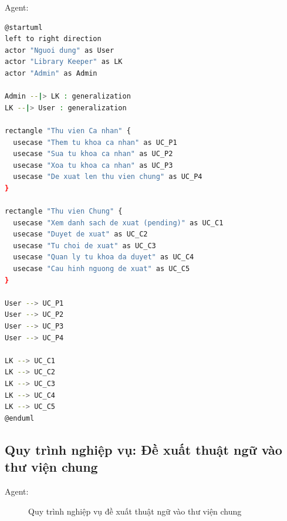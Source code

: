 Agent:
\begin{lstlisting}[language=bash, caption={PlantUML source -- Use Case phan ra: Quan ly thuat ngu}]
@startuml
left to right direction
actor "Nguoi dung" as User
actor "Library Keeper" as LK
actor "Admin" as Admin

Admin --|> LK : generalization
LK --|> User : generalization

rectangle "Thu vien Ca nhan" {
  usecase "Them tu khoa ca nhan" as UC_P1
  usecase "Sua tu khoa ca nhan" as UC_P2
  usecase "Xoa tu khoa ca nhan" as UC_P3
  usecase "De xuat len thu vien chung" as UC_P4
}

rectangle "Thu vien Chung" {
  usecase "Xem danh sach de xuat (pending)" as UC_C1
  usecase "Duyet de xuat" as UC_C2
  usecase "Tu choi de xuat" as UC_C3
  usecase "Quan ly tu khoa da duyet" as UC_C4
  usecase "Cau hinh nguong de xuat" as UC_C5
}

User --> UC_P1
User --> UC_P2
User --> UC_P3
User --> UC_P4

LK --> UC_C1
LK --> UC_C2
LK --> UC_C3
LK --> UC_C4
LK --> UC_C5
@enduml
\end{lstlisting}

\subsection{Quy trình nghiệp vụ: Đề xuất thuật ngữ vào thư viện chung}

Agent:

\begin{figure}[H]
\centering
{}
\caption{Quy trình nghiệp vụ đề xuất thuật ngữ vào thư viện chung}
\label{fig:bpmn_suggest}
\end{figure}

